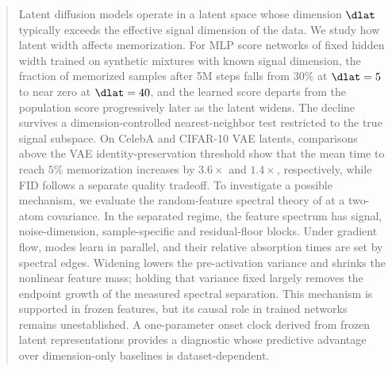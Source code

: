 \begin{abstract}
Latent diffusion models operate in a latent space whose dimension $\dlat$ typically exceeds the effective signal dimension of the data. We study how latent width affects memorization. For MLP score networks of fixed hidden width trained on synthetic mixtures with known signal dimension, the fraction of memorized samples after 5M steps falls from $30\%$ at $\dlat=5$ to near zero at $\dlat=40$, and the learned score departs from the population score progressively later as the latent widens. The decline survives a dimension-controlled nearest-neighbor test restricted to the true signal subspace. On CelebA and CIFAR-10 VAE latents, comparisons above the VAE identity-preservation threshold show that the mean time to reach $5\%$ memorization increases by $3.6\times$ and $1.4\times$, respectively, while FID follows a separate quality tradeoff. To investigate a possible mechanism, we evaluate the random-feature spectral theory of \citet{bonnaire2025} at a two-atom covariance. In the separated regime, the feature spectrum has signal, noise-dimension, sample-specific and residual-floor blocks. Under gradient flow, modes learn in parallel, and their relative absorption times are set by spectral edges. Widening lowers the pre-activation variance and shrinks the nonlinear feature mass; holding that variance fixed largely removes the endpoint growth of the measured spectral separation. This mechanism is supported in frozen features, but its causal role in trained networks remains unestablished. A one-parameter onset clock derived from frozen latent representations provides a diagnostic whose predictive advantage over dimension-only baselines is dataset-dependent.
\end{abstract}
